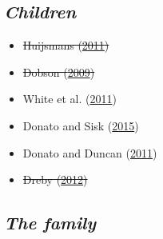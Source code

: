 \documentclass[
]{article}
\providecommand{\tightlist}{%
  \setlength{\itemsep}{0pt}\setlength{\parskip}{0pt}}
\begin{document}
\hypertarget{children}{%
\subsection{\texorpdfstring{\emph{Children}}{Children}}\label{children}}

\begin{itemize}
\tightlist
\item
  \sout{Huijsmans (\protect\hyperlink{ref-huijsmans2011child}{2011})}
\item
  \sout{Dobson (\protect\hyperlink{ref-dobson2009unpacking}{2009})}
\item
  White et al. (\protect\hyperlink{ref-white2011children}{2011})
\item
  Donato and Sisk (\protect\hyperlink{ref-donato2015children}{2015})
\item
  Donato and Duncan (\protect\hyperlink{ref-donato2011migration}{2011})
\item
  \sout{Dreby (\protect\hyperlink{ref-dreby2012burden}{2012})}
\end{itemize}

\hypertarget{the-family}{%
\subsection{\texorpdfstring{\emph{The
family}}{The family}}\label{the-family}}
\end{document}
